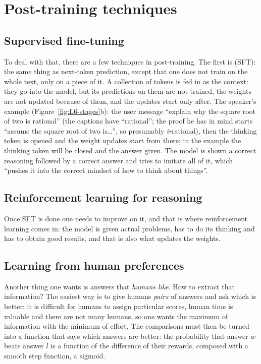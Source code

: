 
\section{Post-training techniques}\label{sec:L6-posttrain}
\subsection{Supervised fine-tuning}\label{sec:L6-sft}
To deal with that, there are a few techniques in post-training. The first is  (SFT): the same thing as next-token prediction, except that one does not train on the whole text, only on a piece of it. A collection of tokens is fed in as the context: they go into the model, but its predictions on them are not trained, the weights are not updated because of them, and the updates start only after. The speaker's example (Figure~\ref{fig:L6-stages}b): the user message ``explain why the square root of two is rational''\flag{} (the captions have ``rational''; the proof he has in mind starts ``assume the square root of two is\dots'', so presumably \emph{ir}rational), then the thinking token is opened and the weight updates start from there; in the example the thinking token will be closed and the answer given. The model is shown a correct reasoning followed by a correct answer and tries to imitate all of it, which ``pushes it into the correct mindset of how to think about things''.

\subsection{Reinforcement learning for reasoning}\label{sec:L6-rlreason}
Once SFT is done one needs to improve on it, and that is where reinforcement learning comes in: the model is given actual problems, has to do its thinking and has to obtain good results, and that is also what updates the weights.

\subsection{Learning from human preferences}\label{sec:L6-preference}
Another thing one wants is answers that \emph{humans like}. How to extract that information? The easiest way is to give humans \emph{pairs} of answers and ask which is better: it is difficult for humans to assign particular scores, human time is valuable and there are not many humans, so one wants the maximum of information with the minimum of effort. The comparisons must then be turned into a function that says which answers are better: the probability that answer $w$ beats answer $l$ is a function of the difference of their rewards, composed with a smooth step function, a sigmoid.

